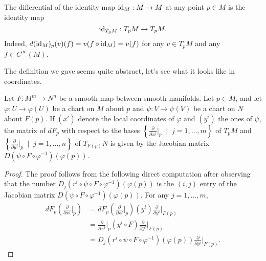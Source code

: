 \begin{remark}
  The differential of the identity map $\operatorname{id}_M:M\to M$ at any point $p\in M$ is the identity map
  \begin{equation}
    \operatorname{id}_{T_pM}: T_pM \to T_pM.
  \end{equation}
  Indeed, $d (\operatorname{id}_M)_p(v)(f) = v(f\circ\operatorname{id}_M) = v(f)$ for any $v\in T_pM$ and any $f\in C^\infty(M)$.
\end{remark}

The definition we gave seems quite abstract, let's see what it looks like in coordinates.

\begin{proposition}\label{prop:DiffCoords}
  Let $F:M^m\to N^n$ be a smooth map between smooth manifolds.
  Let $p\in M$, and let $\varphi : U \to \varphi(U)$ be a chart on $M$ about $p$ and $\psi: V \to \psi(V)$ be a chart on $N$ about $F(p)$.
  If $(x^i)$ denote the local coordinates of $\varphi$ and $(y^i)$ the ones of $\psi$, the matrix of $dF_p$ with respect to the bases $\left\{\frac{\partial}{\partial x^j}\big|_p \;\mid\; j=1,\ldots,m\right\}$ of $T_pM$ and $\left\{\frac{\partial}{\partial y^j}\big|_p \;\mid\; j=1,\ldots,n\right\}$ of $T_{F(p)}N$ is given by the Jacobian matrix $D(\psi\circ F \circ\varphi^{-1})(\varphi(p))$.
\end{proposition}
\begin{proof}
  The proof follows from the following direct computation after observing that the number $D_j(r^i \circ \psi \circ F \circ \varphi^{-1})(\varphi(p))$ is the $(i,j)$ entry of the Jacobian matrix $D(\psi\circ F \circ\varphi^{-1})(\varphi(p))$. For any $j=1,\ldots,m$,
  \begin{align}
    dF_p \left(\frac{\partial}{\partial x^j}\Big|_p\right)
    &= %
      dF_p \left(\frac{\partial}{\partial x^j}\Big|_p\right) (y^i) \frac{\partial}{\partial y^i}\Big|_{F(p)} \\
    &= %
      \frac{\partial}{\partial x^j}\Big|_p (y^i \circ F) \frac{\partial}{\partial y^i}\Big|_{F(p)} \\
    &=%
      D_j(r^i \circ \psi \circ F \circ \varphi^{-1})(\varphi(p)) \frac{\partial}{\partial y^i}\Big|_{F(p)}.
  \end{align}
\end{proof}

